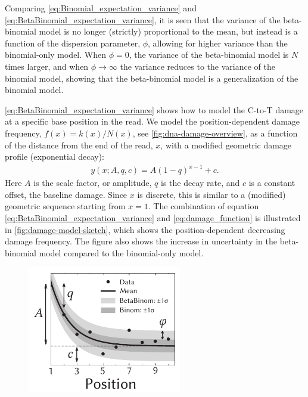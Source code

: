 Comparing \autoref{eq:Binomial_expectation_variance} and \autoref{eq:BetaBinomial_expectation_variance}, it is seen that the variance of the beta-binomial model is no longer (strictly) proportional to the mean, but instead is a function of the dispersion parameter, $\phi$, allowing for higher variance than the binomial-only model. When $\phi = 0$, the variance of the beta-binomial model is $N$ times larger, and when $\phi \rightarrow \infty$ the variance reduces to the variance of the binomial model, showing that the beta-binomial model is a generalization of the binomial model.

\autoref{eq:BetaBinomial_expectation_variance} shows how to model the C-to-T damage at a specific base position in the read. We model the position-dependent damage frequency, $f(x) = k(x) / N(x)$, see \autoref{fig:dna-damage-overview}, as a function of the distance from the end of the read, $x$, with a modified geometric damage profile (exponential decay):
\begin{align}
    y(x; A, q, c) = A(1-q)^{x-1} + c.
    \label{eq:damage_function}
\end{align}
Here $A$ is the scale factor, or amplitude, $q$ is the decay rate, and $c$ is a constant offset, the baseline damage. Since $x$ is discrete, this is similar to a (modified) geometric sequence starting from $x=1$. The combination of equation \eqref{eq:BetaBinomial_expectation_variance} and \eqref{eq:damage_function} is illustrated in \autoref{fig:damage-model-sketch}, which shows the position-dependent decreasing damage frequency. The figure also shows the increase in uncertainty in the beta-binomial model compared to the binomial-only model.
\begin{figure}[htbp]
    \centering
    \includegraphics[width=0.6\textwidth]{figures/damage_sketch_new.pdf}
\end{figure}

